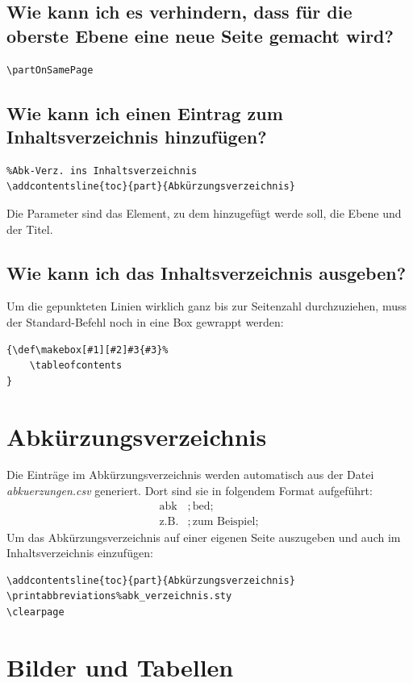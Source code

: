 \documentclass[12pt]{article}
\begin{document}
\subsection{Wie kann ich es verhindern, dass für die oberste Ebene eine neue Seite gemacht wird?}
\begin{verbatim}
\partOnSamePage
\end{verbatim}

\subsection{Wie kann ich einen Eintrag zum Inhaltsverzeichnis hinzufügen?}
\begin{verbatim}
%Abk-Verz. ins Inhaltsverzeichnis
\addcontentsline{toc}{part}{Abkürzungsverzeichnis}
\end{verbatim}
Die Parameter sind das Element, zu dem hinzugefügt werde soll, die Ebene und der Titel.

\subsection{Wie kann ich das Inhaltsverzeichnis ausgeben?}
Um die gepunkteten Linien wirklich ganz bis zur Seitenzahl durchzuziehen, muss der Standard-Befehl noch in eine Box gewrappt werden:
\begin{verbatim}
{\def\makebox[#1][#2]#3{#3}%
	\tableofcontents
}
\end{verbatim}

\section{Abkürzungsverzeichnis}
Die Einträge im Abkürzungsverzeichnis werden automatisch aus der Datei \textit{abkuerzungen.csv} generiert. Dort sind sie in folgendem Format aufgeführt:
\begin{align*}
\text{abk}&;\text{bed};\\
\text{z.B.} &;\text{zum Beispiel};
\end{align*}
\noindent Um das Abkürzungsverzeichnis auf einer eigenen Seite auszugeben und auch im Inhaltsverzeichnis einzufügen:
\begin{verbatim}
\addcontentsline{toc}{part}{Abkürzungsverzeichnis}
\printabbreviations%abk_verzeichnis.sty
\clearpage
\end{verbatim}

\section{Bilder und Tabellen}
\end{document}
